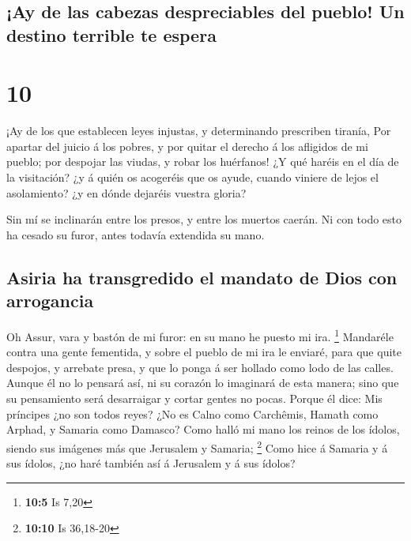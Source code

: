 \hypertarget{ay-de-las-cabezas-despreciables-del-pueblo-un-destino-terrible-te-espera}{%
\subsection{¡Ay de las cabezas despreciables del pueblo! Un destino
terrible te
espera}\label{ay-de-las-cabezas-despreciables-del-pueblo-un-destino-terrible-te-espera}}

\hypertarget{section-9}{%
\section{10}\label{section-9}}

 ¡Ay de los que establecen leyes injustas, y determinando
prescriben tiranía,  Por apartar del juicio á los pobres,
y por quitar el derecho á los afligidos de mi pueblo; por despojar las
viudas, y robar los huérfanos!  ¿Y qué haréis en el día de
la visitación? ¿y á quién os acogeréis que os ayude, cuando viniere de
lejos el asolamiento? ¿y en dónde dejaréis vuestra gloria?

 Sin mí se inclinarán entre los presos, y entre los
muertos caerán. Ni con todo esto ha cesado su furor, antes todavía
extendida su mano.

\hypertarget{asiria-ha-transgredido-el-mandato-de-dios-con-arrogancia}{%
\subsection{Asiria ha transgredido el mandato de Dios con
arrogancia}\label{asiria-ha-transgredido-el-mandato-de-dios-con-arrogancia}}

 Oh Assur, vara y bastón de mi furor: en su mano he puesto
mi ira. \footnote{\textbf{10:5} Is 7,20}  Mandaréle contra
una gente fementida, y sobre el pueblo de mi ira le enviaré, para que
quite despojos, y arrebate presa, y que lo ponga á ser hollado como lodo
de las calles.  Aunque él no lo pensará así, ni su corazón
lo imaginará de esta manera; sino que su pensamiento será desarraigar y
cortar gentes no pocas.  Porque él dice: Mis príncipes ¿no
son todos reyes?  ¿No es Calno como Carchêmis, Hamath como
Arphad, y Samaria como Damasco?  Como halló mi mano los
reinos de los ídolos, siendo sus imágenes más que Jerusalem y Samaria;
\footnote{\textbf{10:10} Is 36,18-20}  Como hice á
Samaria y á sus ídolos, ¿no haré también así á Jerusalem y á sus ídolos?

